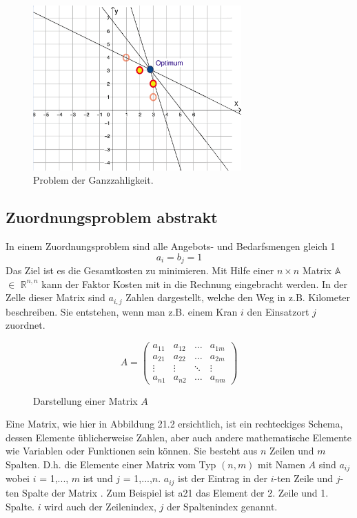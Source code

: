 \begin{figure}
\centering
\includegraphics[width=8cm]{papers/munkres/figures/ganzzahlige_punkte}
\caption{Problem der Ganzzahligkeit.}
\label{munkres:Vr2}
\end{figure}


\subsection{Zuordnungsproblem abstrakt
\label{munkres:subsection:bonorum}}

In einem Zuordnungsproblem sind alle Angebots- und Bedarfsmengen gleich 1 
\begin{equation}
a_{i}=b_{j}=1
\end{equation}
Das Ziel ist es die Gesamtkosten zu minimieren. Mit Hilfe einer $n\times n$ Matrix $\mathbb{A}$ $\mathbb{\in}$ $\mathbb{R}^{n,n}$ kann der Faktor Kosten mit in die Rechnung eingebracht werden.
In der Zelle dieser Matrix sind $a_{i,j}$ Zahlen dargestellt, welche den Weg in z.B. Kilometer beschreiben.
Sie entstehen, wenn man z.B. einem Kran $i$ den Einsatzort $j$ zuordnet.

\begin{figure}
\[
A
=
\begin{pmatrix}
a_{11}&a_{12}&\dots &a_{1m}\\
a_{21}&a_{22}&\dots &a_{2m}\\
\vdots&\vdots&\ddots&\vdots\\
a_{n1}&a_{n2}&\dots &a_{nm}
\end{pmatrix}
\]
\caption{Darstellung einer Matrix $A$}
\end{figure}
Eine Matrix, wie hier in Abbildung 21.2 ersichtlich, ist ein rechteckiges Schema, dessen Elemente üblicherweise Zahlen, aber auch andere mathematische Elemente wie Variablen oder Funktionen sein können. Sie besteht aus $n$ Zeilen und $m$ Spalten. D.h. die Elemente einer Matrix vom Typ $(n,m)$ mit Namen $A$ sind $a_{ij}$ wobei $i$ = 1,..., $m$ ist und $j$ = 1,...,$n$. $a_{ij}$ ist der Eintrag in der $i$-ten Zeile und $j$-ten Spalte der Matrix . Zum Beispiel ist a21 das Element der 2. Zeile und 1. Spalte. $i$ wird auch der Zeilenindex, $j$ der Spaltenindex genannt.

